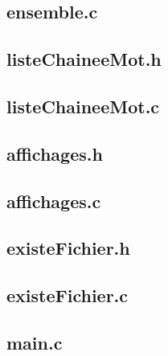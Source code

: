 \subsection{ensemble.c}

\bigskip

\subsection{listeChaineeMot.h}

\bigskip

\subsection{listeChaineeMot.c}

\bigskip

\subsection{affichages.h}

\bigskip

\subsection{affichages.c}

\bigskip

\subsection{existeFichier.h}

\bigskip

\subsection{existeFichier.c}

\bigskip

\subsection{main.c}


